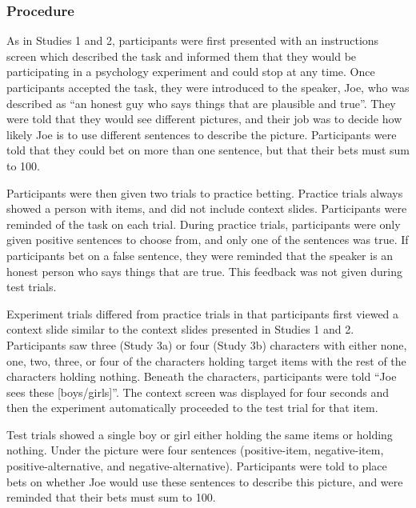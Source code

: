 \documentclass[10pt,letterpaper]{article}
\begin{document}
\subsubsection{Procedure}
As in Studies 1 and 2, participants were first presented with an instructions screen which described the task and informed them that they would be participating in a psychology experiment and could stop at any time.  Once participants accepted the task, they were introduced to the speaker, Joe, who was described as ``an honest guy who says things that are plausible and true''.  They were told that they would see different pictures, and their job was to decide how likely Joe is to use different sentences to describe the picture.  Participants were told that they could bet on more than one sentence, but that their bets must sum to 100.  

Participants were then given two trials to practice betting.  Practice trials always showed a person with items, and did not include context slides.  Participants were reminded of the task on each trial.  During practice trials, participants were only given positive sentences to choose from, and only one of the sentences was true.  If participants bet on a false sentence, they were reminded that the speaker is an honest person who says things that are true.  This feedback was not given during test trials.

Experiment trials differed from practice trials in that participants first viewed a context slide similar to the context slides presented in Studies 1 and 2.  Participants saw three (Study 3a) or four (Study 3b) characters with either none, one, two, three, or four of the characters holding target items with the rest of the characters holding nothing.  Beneath the characters, participants were told ``Joe sees these [boys/girls]''.  The context screen was displayed for four seconds and then the experiment automatically proceeded to the test trial for that item.  

Test trials showed a single boy or girl either holding the same items or holding nothing.  Under the picture were four sentences (positive-item, negative-item, positive-alternative, and negative-alternative).  Participants were told to place bets on whether Joe would use these sentences to describe this picture, and were reminded that their bets must sum to 100.  
\end{document}
